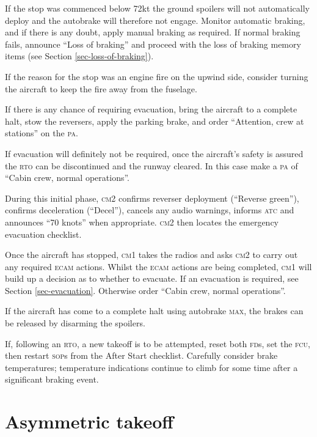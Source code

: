\documentclass[a5paper,11pt,twoside]{book}
\newcommand{\ac}[1]{{\scshape\MakeLowercase{#1}}}
\newcommand{\cphrase}[1]{\ac{#1}}
\newcommand{\inlcite}[1]{{\ac{#1}}}
\newcommand{\multicite}[1]{%
  \nopagebreak
  \noindent{{\color{blue}\footnotesize[ \inlcite{#1} ]}}
}
\begin{document}
If the stop was commenced below 72kt the ground spoilers will not automatically
deploy and the autobrake will therefore not engage. Monitor automatic braking,
and if there is any doubt, apply manual braking as required. If normal braking
fails, announce ``Loss of braking'' and proceed with the loss of braking memory
items (see Section \ref{sec-loss-of-braking}).

If the reason for the stop was an engine fire on the upwind side, consider
turning the aircraft to keep the fire away from the fuselage.

If there is any chance of requiring evacuation, bring the aircraft to a complete
halt, stow the reversers, apply the parking brake, and order ``Attention, crew
at stations'' on the \ac{PA}.

If evacuation will definitely not be required, once the aircraft's safety is
assured the \ac{RTO} can be discontinued and the runway cleared. In this case
make a \ac{PA} of ``Cabin crew, normal operations''.

During this initial phase, \ac{CM2} confirms reverser deployment (``Reverse
green''), confirms deceleration (``Decel''), cancels any audio warnings, informs
\ac{ATC} and announces ``70 knots'' when appropriate. \ac{CM2} then locates the
emergency evacuation checklist.

Once the aircraft has stopped, \ac{CM1} takes the radios and asks \ac{CM2} to
carry out any required \ac{ECAM} actions. Whilst the \ac{ECAM} actions are being
completed, \ac{CM1} will build up a decision as to whether to evacuate. If an
evacuation is required, see Section \ref{sec-evacuation}. Otherwise order
``Cabin crew, normal operations''.

If the aircraft has come to a complete halt using autobrake \cphrase{MAX}, the brakes
can be released by disarming the spoilers.

If, following an \ac{RTO}, a new takeoff is to be attempted, reset both
\ac{FD}s, set the \ac{FCU}, then restart \ac{SOP}s from the After Start
checklist. Carefully consider brake temperatures; temperature indications
continue to climb for some time after a significant braking event.

\multicite{EOMB~3.10, FCTM~PRO.AEP.MISC}


\section{Asymmetric takeoff}
\end{document}
